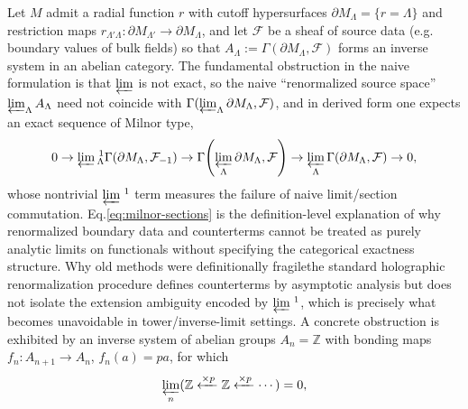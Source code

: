 \documentclass[11pt]{article}
\theoremstyle{remark}
\newcommand{\Z}{\mathbb{Z}}
\begin{document}
Let \(M\) admit a radial function \(r\) with cutoff hypersurfaces \(\partial M_{\Lambda}=\{r=\Lambda\}\) and restriction maps \(r_{\Lambda'\Lambda}:\partial M_{\Lambda'}\to \partial M_{\Lambda}\), and let \(\mathcal{F}\) be a sheaf of source data (e.g. boundary values of bulk fields) so that \(A_{\Lambda}:=\Gamma(\partial M_{\Lambda},\mathcal{F})\) forms an inverse system in an abelian category. The fundamental obstruction in the naive formulation is that \(\varprojlim\) is not exact, so the naive ``renormalized source space'' \(\varprojlim_{\Lambda}A_{\Lambda}\) need not coincide with \(\Gamma(\varprojlim_{\Lambda}\partial M_{\Lambda},\mathcal{F})\), and in derived form one expects an exact sequence of Milnor type,
\begin{equation}\label{eq:milnor-sections}
0\to \varprojlim{}^{\,1}_{\Lambda} \Gamma(\partial M_{\Lambda},\mathcal{F}_{-1})\to \Gamma\!\left(\varprojlim_{\Lambda}\partial M_{\Lambda},\mathcal{F}\right)\to \varprojlim_{\Lambda}\Gamma(\partial M_{\Lambda},\mathcal{F})\to 0,
\end{equation}
whose nontrivial \(\varprojlim{}^{\,1}\) term measures the failure of naive limit/section commutation. Eq.\eqref{eq:milnor-sections} is the definition-level explanation of why renormalized boundary data and counterterms cannot be treated as purely analytic limits on functionals without specifying the categorical exactness structure. Why old methods were definitionally fragile\:the standard holographic renormalization procedure defines counterterms by asymptotic analysis but does not isolate the extension ambiguity encoded by \(\varprojlim{}^{\,1}\), which is precisely what becomes unavoidable in tower/inverse-limit settings. A concrete obstruction is exhibited by an inverse system of abelian groups \(A_n=\Z\) with bonding maps \(f_n:A_{n+1}\to A_n\), \(f_n(a)=p a\), for which
\begin{equation}\label{eq:lim0}
\varprojlim_{n}(\Z\xleftarrow{\times p}\Z\xleftarrow{\times p}\cdots)=0,
\end{equation}
\end{document}

